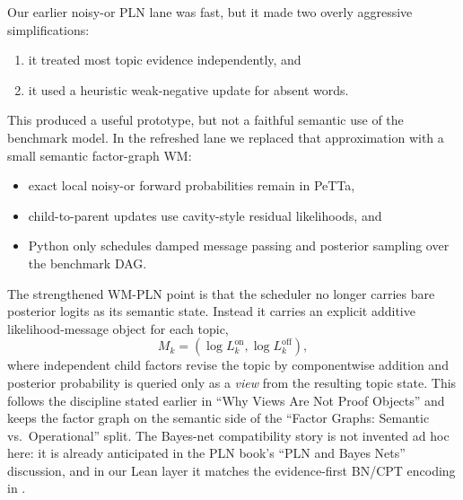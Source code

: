 \documentclass[11pt,openany]{report}
\begin{document}
Our earlier noisy-or PLN lane was fast, but it made two overly aggressive
simplifications:
\begin{enumerate}
\item it treated most topic evidence independently, and
\item it used a heuristic weak-negative update for absent words.
\end{enumerate}
This produced a useful prototype, but not a faithful semantic use of the
benchmark model.  In the refreshed lane we replaced that approximation with a
small semantic factor-graph WM:
\begin{itemize}
\item exact local noisy-or forward probabilities remain in PeTTa,
\item child-to-parent updates use cavity-style residual likelihoods, and
\item Python only schedules damped message passing and posterior sampling over
the benchmark DAG.
\end{itemize}

The strengthened WM-PLN point is that the scheduler no longer carries bare
posterior logits as its semantic state.  Instead it carries an explicit
additive likelihood-message object for each topic,
\[
  M_k = (\log L_k^{\mathrm{on}}, \log L_k^{\mathrm{off}}),
\]
where independent child factors revise the topic by componentwise addition and
posterior probability is queried only as a \emph{view} from the resulting topic
state.  This follows the discipline stated earlier in ``Why Views Are Not
Proof Objects'' and keeps the factor graph on the semantic side of the
``Factor Graphs: Semantic vs.\ Operational'' split.  The Bayes-net
compatibility story is not invented ad hoc here: it is already anticipated in
the PLN book's ``PLN and Bayes Nets'' discussion, and in our Lean layer it
matches the evidence-first BN/CPT encoding in
.
\end{document}
